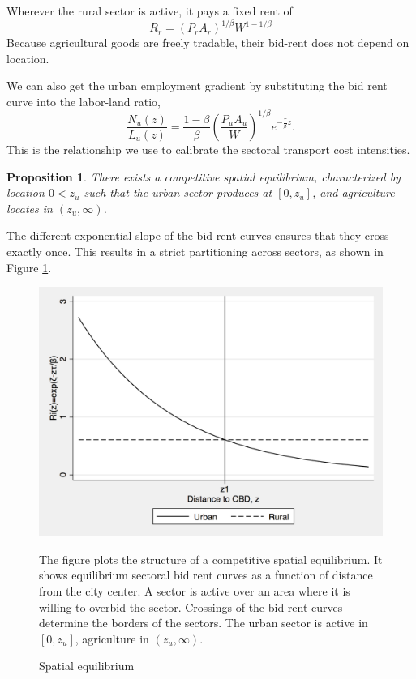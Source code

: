 \documentclass[12pt]{article}
\newtheorem{proposition}{Proposition}
\begin{document}
Wherever the rural sector is active, it pays a fixed rent of
\[
R_r = (P_rA_r)^{1/\beta} W^{1-1/\beta}
\]
Because agricultural goods are freely tradable, their bid-rent does not depend on location.

We can also get the urban employment gradient by substituting the bid rent curve into the labor-land ratio,
\begin{equation}
\label{eq:EmpGrad}
\frac{N_u(z)}{L_u(z)} = \frac{1-\beta}{\beta} \left(\frac{P_uA_u}{W}\right)^{1/\beta} e^{-\frac{\tau}{\beta} z}.
\end{equation}
This is the relationship we use to calibrate the sectoral transport cost intensities.

\begin{proposition}\label{prop:existence}
There exists a competitive spatial equilibrium, characterized by location $0<z_u$ such that the urban sector produces at $\left[0,z_u\right]$, and agriculture locates in $(z_u,\infty)$.
\end{proposition}
The different exponential slope of the bid-rent curves ensures that they cross exactly once. This results in a strict partitioning across sectors, as shown in Figure \ref{fig:BidRent}.

\begin{figure}[h!]
\caption{Spatial equilibrium\label{fig:BidRent}}
\begin{center}
\includegraphics[scale=0.4]{figures/bid_rent_curves}
\end{center}

\noindent \footnotesize{The figure plots the structure of a competitive spatial equilibrium. It shows equilibrium sectoral bid rent curves as a function of distance from the city center. A sector is active over an area where it is willing to overbid the sector. Crossings of the bid-rent curves determine the borders of the sectors. The urban sector is active in $[0,z_u]$, agriculture in $(z_u,\infty)$.}
\end{figure}
\end{document}
